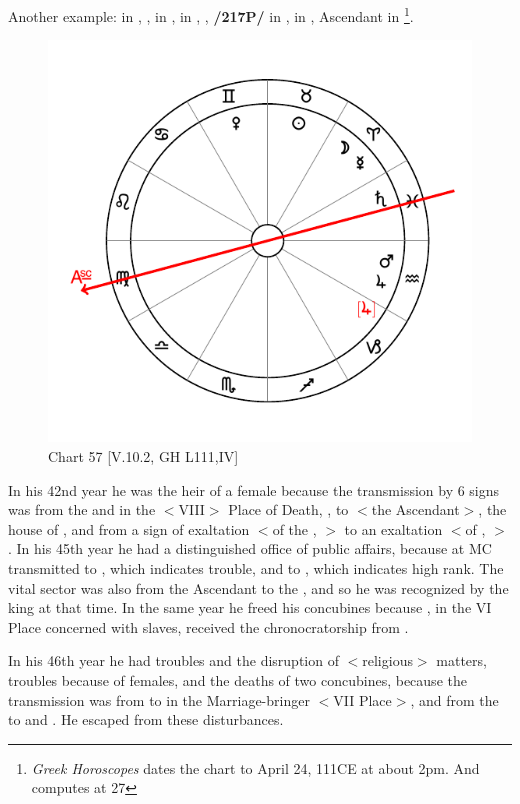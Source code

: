 Another example: \Sun\xspace in \Taurus, \Moon, \Mercury\xspace in \Aries, \Saturn\xspace in \Pisces, \Jupiter, \textbf{/217P/} \Mars\xspace in \Aquarius, \Venus\xspace in \Gemini, Ascendant in \Virgo\footnote{\textit{Greek Horoscopes} dates the chart to April 24, 111CE at about 2pm. And computes \Jupiter\xspace at 27 \Capricorn}. 

\begin{figure}
\centering
\vspace{-20pt}
\includegraphics[width=.68\textwidth]{charts/5_10_2}
\caption{Chart 57 [V.10.2, GH L111,IV]}
\label{fig:chart57}
\end{figure}

In his 42nd year he was the heir of a female because the transmission by 6 signs was from the \Moon\xspace and \Mercury\xspace in the $<$VIII$>$ Place of Death, \Aries, to \Virgo\xspace $<$the Ascendant$>$, the house of \Mercury, and from a sign of exaltation $<$of the \Sun, \Aries$>$ to an exaltation $<$of \Mercury, \Virgo$>$. In his 45th year he had a distinguished office of public affairs, because \Venus\xspace at MC transmitted to \Mars, which indicates trouble, and to \Jupiter, which indicates high rank. The vital sector was also from the Ascendant to the \Sun, and so he was recognized by the king at that time. In the same year he freed his concubines because \Jupiter, in the VI Place concerned with slaves, received the
chronocratorship from \Venus. 

In his 46th year he had troubles and the disruption of $<$religious$>$ matters, troubles because of females, and the deaths of two concubines, because the transmission was from \Venus\xspace to
\Saturn\xspace in the Marriage-bringer $<$VII Place$>$, and from the \Sun\xspace to \Mars\xspace and \Jupiter. He escaped from these
disturbances.

